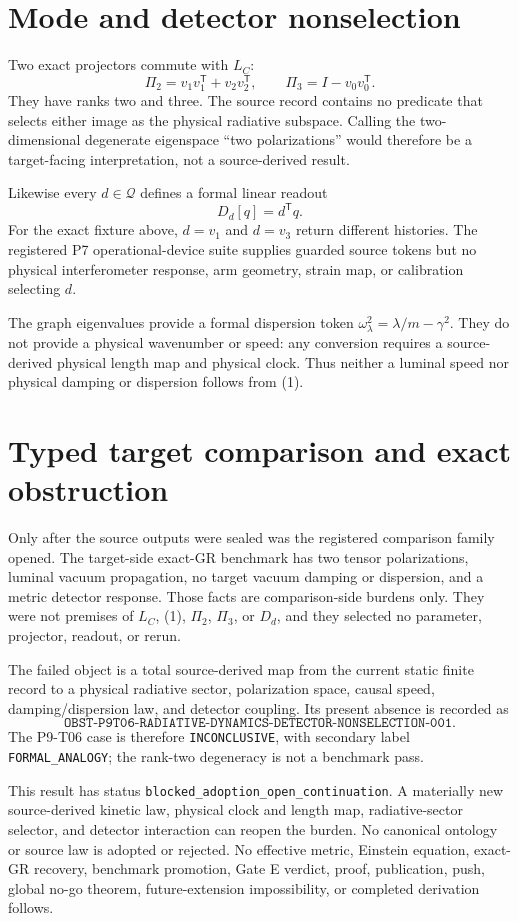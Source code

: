 \documentclass[11pt]{article}
\newcommand{\Qspace}{\mathcal Q}
\newcommand{\LC}{L_C}
\begin{document}
\section{Mode and detector nonselection}

Two exact projectors commute with \(\LC\):
\[
 \Pi_2=v_1v_1^\mathsf T+v_2v_2^\mathsf T,\qquad
 \Pi_3=I-v_0v_0^\mathsf T.
\]
They have ranks two and three.  The source record contains no predicate that
selects either image as the physical radiative subspace.  Calling the
two-dimensional degenerate eigenspace ``two polarizations'' would therefore
be a target-facing interpretation, not a source-derived result.

Likewise every \(d\in\Qspace\) defines a formal linear readout
\[
 D_d[q]=d^\mathsf Tq.
\]
For the exact fixture above, \(d=v_1\) and \(d=v_3\) return different
histories.  The registered P7 operational-device suite supplies guarded source
tokens but no physical interferometer response, arm geometry, strain map, or
calibration selecting \(d\).

The graph eigenvalues provide a formal dispersion token
\(\omega_\lambda^2=\lambda/m-\gamma^2\).  They do not provide a physical
wavenumber or speed: any conversion requires a source-derived physical length
map and physical clock.  Thus neither a luminal speed nor physical damping or
dispersion follows from (1).

\section{Typed target comparison and exact obstruction}

Only after the source outputs were sealed was the registered comparison
family opened.  The target-side exact-GR benchmark has two tensor
polarizations, luminal vacuum propagation, no target vacuum damping or
dispersion, and a metric detector response.  Those facts are comparison-side
burdens only.  They were not premises of \(\LC\), (1), \(\Pi_2\), \(\Pi_3\),
or \(D_d\), and they selected no parameter, projector, readout, or rerun.

The failed object is a total source-derived map from the current static finite
record to a physical radiative sector, polarization space, causal speed,
damping/dispersion law, and detector coupling.  Its present absence is
recorded as
\[
\texttt{OBST-P9T06-RADIATIVE-DYNAMICS-DETECTOR-NONSELECTION-001}.
\]
The P9-T06 case is therefore \texttt{INCONCLUSIVE}, with secondary label
\texttt{FORMAL\_ANALOGY}; the rank-two degeneracy is not a benchmark pass.

This result has status \texttt{blocked\_adoption\_open\_continuation}.
A materially new source-derived kinetic law, physical clock and length map,
radiative-sector selector, and detector interaction can reopen the burden.
No canonical ontology or source law is adopted or rejected.  No effective
metric, Einstein equation, exact-GR recovery, benchmark promotion, Gate E
verdict, proof, publication, push, global no-go theorem, future-extension
impossibility, or completed derivation follows.
\end{document}

